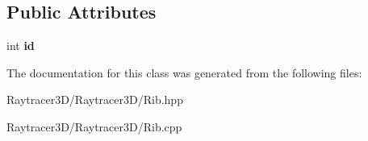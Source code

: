 \subsection*{Public Attributes}
\begin{DoxyCompactItemize}
\item 
\hypertarget{class_rib_ac88341591298af4d11837a09b47917d5}{}\label{class_rib_ac88341591298af4d11837a09b47917d5} 
int {\bfseries id}
\end{DoxyCompactItemize}


The documentation for this class was generated from the following files\+:\begin{DoxyCompactItemize}
\item 
Raytracer3\+D/\+Raytracer3\+D/Rib.\+hpp\item 
Raytracer3\+D/\+Raytracer3\+D/Rib.\+cpp\end{DoxyCompactItemize}
